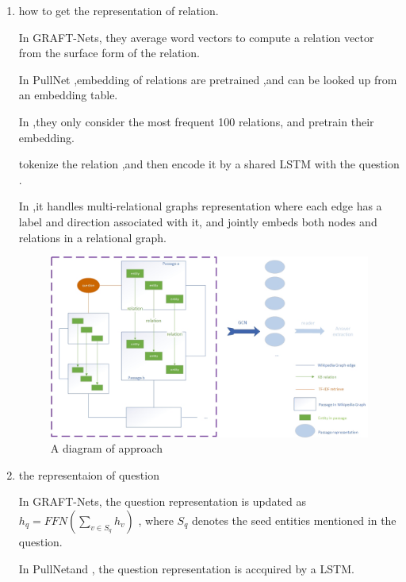\documentclass[sigconf]{acmart}
\begin{document}
   	\begin{enumerate}[(1)]
   		
   	\item how to get the representation of relation.
   	
	   	In GRAFT-Nets\cite{sun2018open}, they average word
	   	vectors to compute a relation vector  from the
	   	surface form of the relation.
	   	
	   	In PullNet\cite{sun2019pullnet} ,embedding of  relations are pretrained ,and can be looked up from an embedding table.
	   	
	   	In \cite{min2019knowledge} ,they only consider the most frequent 100 relations, and pretrain their embedding.	
	   	
	   	 \cite{xiong2019improving} tokenize the relation ,and then  encode it by a shared LSTM with the question .
	   
	   	
	   	In \cite{2020Composition},it handles multi-relational graphs  representation where each edge has a label and direction associated with it, and jointly embeds both nodes and relations in a relational graph.
	   	
	   	\begin{figure}[ht]		
	   		\centering
	   		\includegraphics[scale=0.5]{model.jpg}
	   		\caption{A diagram of approach}
	   		\label{fig:label}
	   	\end{figure}
	   	
   	
   	\item the representaion of question
   	
   		In GRAFT-Nets\cite{sun2018open},
   		the question representation is updated as
   		$h_q = FFN(\sum_{v\in S_q}h_v)$
   		, where $S_q$ denotes the seed entities mentioned in the question.
   		
   		In PullNet\cite{sun2019pullnet}and \cite{xiong2019improving} ,	the question representation is accquired by a LSTM.
   		

\end{enumerate}
\end{document}
